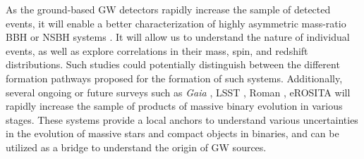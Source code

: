 \documentclass[linenumbers,trackchanges,twocolumn]{aastex701}
\begin{document}
As the ground-based GW detectors rapidly increase the sample of detected events, it will enable a better characterization of highly asymmetric mass-ratio BBH or NSBH systems \citep[e.g.,][]{2024A&A...683A.144X}. It will allow us to understand the nature of individual events, as well as explore correlations in their mass, spin, and redshift distributions. Such studies could potentially distinguish between the different formation pathways proposed for the formation of such systems. Additionally, several ongoing or future surveys such as \emph{Gaia} \citep[e.g.,][]{2023A&A...674A...1G, 2024NewAR..9801694E}, LSST \citep[e.g.,][]{2023PASP..135j5002H}, Roman \citep[e.g.,][]{2023arXiv230612514L}, eROSITA \citep[e.g.,][]{2024A&A...682A..34M} will rapidly increase the sample of products of massive binary evolution in various stages. These systems provide a local anchors to understand various uncertainties in the evolution of massive stars and compact objects in binaries, and can be utilized as a bridge to understand the origin of GW sources.
\end{document}
